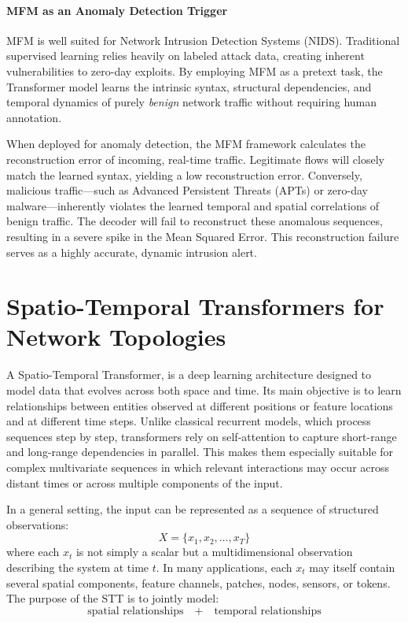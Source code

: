\documentclass[12pt, a4paper]{report}
\begin{document}
\paragraph{MFM as an Anomaly Detection Trigger}
MFM is well suited for Network Intrusion Detection Systems (NIDS). Traditional supervised learning relies heavily on labeled attack data, creating inherent vulnerabilities to zero-day exploits. By employing MFM as a pretext task, the Transformer model learns the intrinsic syntax, structural dependencies, and temporal dynamics of purely \textit{benign} network traffic without requiring human annotation.

When deployed for anomaly detection, the MFM framework calculates the reconstruction error of incoming, real-time traffic. Legitimate flows will closely match the learned syntax, yielding a low reconstruction error. Conversely, malicious traffic—such as Advanced Persistent Threats (APTs) or zero-day malware—inherently violates the learned temporal and spatial correlations of benign traffic. The decoder will fail to reconstruct these anomalous sequences, resulting in a severe spike in the Mean Squared Error. This reconstruction failure serves as a highly accurate, dynamic intrusion alert.


\section{Spatio-Temporal Transformers for Network Topologies}


A Spatio-Temporal Transformer, is a deep learning architecture designed to model data that evolves across both space and time. Its main objective is to learn relationships between entities observed at different positions or feature locations and at different time steps. Unlike classical recurrent models, which process sequences step by step, transformers rely on self-attention to capture short-range and long-range dependencies in parallel. This makes them especially suitable for complex multivariate sequences in which relevant interactions may occur across distant times or across multiple components of the input.

In a general setting, the input can be represented as a sequence of structured observations:
$$
X = \{x_1, x_2, \dots, x_T\}
$$
where each $x_t$ is not simply a scalar but a multidimensional observation describing the system at time $t$. In many applications, each $x_t$ may itself contain several spatial components, feature channels, patches, nodes, sensors, or tokens. The purpose of the STT is to jointly model:
$$
\text{spatial relationships} \quad+\quad \text{temporal relationships}
$$
\end{document}
